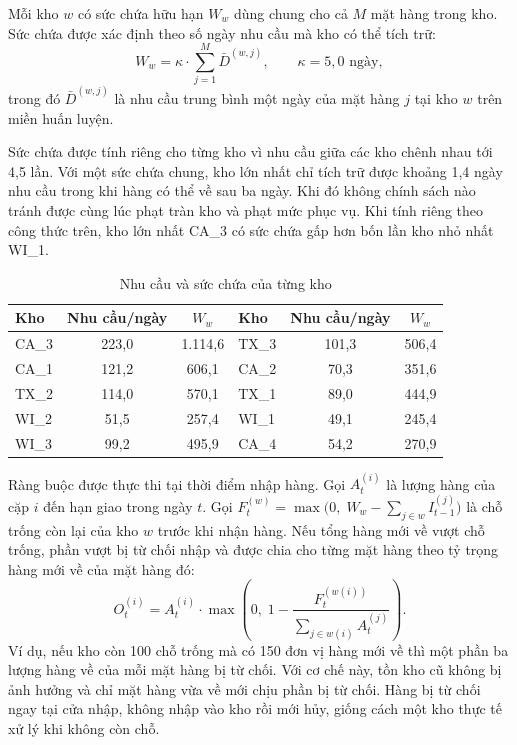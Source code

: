 Mỗi kho $w$ có sức chứa hữu hạn $W_w$ dùng chung cho cả $M$ mặt hàng trong kho. Sức chứa được xác định theo số ngày nhu cầu mà kho có thể tích trữ:
\begin{equation}
    W_w = \kappa \cdot \sum_{j = 1}^{M} \bar{D}^{(w, j)},
    \qquad \kappa = 5{,}0 \text{ ngày},
    \label{eq:sucChua}
\end{equation}
trong đó $\bar{D}^{(w,j)}$ là nhu cầu trung bình một ngày của mặt hàng $j$ tại kho $w$ trên miền huấn luyện.

Sức chứa được tính riêng cho từng kho vì nhu cầu giữa các kho chênh nhau tới 4,5 lần. Với một sức chứa chung, kho lớn nhất chỉ tích trữ được khoảng 1,4 ngày nhu cầu trong khi hàng có thể về sau ba ngày. Khi đó không chính sách nào tránh được cùng lúc phạt tràn kho và phạt mức phục vụ. Khi tính riêng theo công thức trên, kho lớn nhất CA\_3 có sức chứa gấp hơn bốn lần kho nhỏ nhất WI\_1.

\begin{table}[H]
    \centering
    \caption{Nhu cầu và sức chứa của từng kho}
    \label{tab:sucChuaKho}
    \begin{tabular}{|l|c|c||l|c|c|}
        \hline
        Kho & Nhu cầu/ngày & $W_w$ &
        Kho & Nhu cầu/ngày & $W_w$ \\
        \hline
        CA\_3 & 223,0 & 1.114,6 & TX\_3 & 101,3 & 506,4 \\ \hline
        CA\_1 & 121,2 & 606,1   & CA\_2 & 70,3  & 351,6 \\ \hline
        TX\_2 & 114,0 & 570,1   & TX\_1 & 89,0  & 444,9 \\ \hline
        WI\_2 & 51,5  & 257,4   & WI\_1 & 49,1  & 245,4 \\ \hline
        WI\_3 & 99,2  & 495,9   & CA\_4 & 54,2  & 270,9 \\
        \hline
    \end{tabular}
\end{table}

Ràng buộc được thực thi tại thời điểm nhập hàng. Gọi $A_t^{(i)}$ là lượng hàng của cặp $i$ đến hạn giao trong ngày $t$. Gọi $F_t^{(w)} = \max\bigl(0,\; W_w - \sum_{j \in w} I_{t-1}^{(j)}\bigr)$ là chỗ trống còn lại của kho $w$ trước khi nhận hàng. Nếu tổng hàng mới về vượt chỗ trống, phần vượt bị từ chối nhập và được chia cho từng mặt hàng theo tỷ trọng hàng mới về của mặt hàng đó:
\begin{equation}
    O_t^{(i)} = A_t^{(i)} \cdot \max\!\left(0,\; 1 - \frac{F_t^{(w(i))}}{\sum_{j \in w(i)} A_t^{(j)}}\right).
    \label{eq:tranKho}
\end{equation}
Ví dụ, nếu kho còn 100 chỗ trống mà có 150 đơn vị hàng mới về thì một phần ba lượng hàng về của mỗi mặt hàng bị từ chối. Với cơ chế này, tồn kho cũ không bị ảnh hưởng và chỉ mặt hàng vừa về mới chịu phần bị từ chối. Hàng bị từ chối ngay tại cửa nhập, không nhập vào kho rồi mới hủy, giống cách một kho thực tế xử lý khi không còn chỗ.

